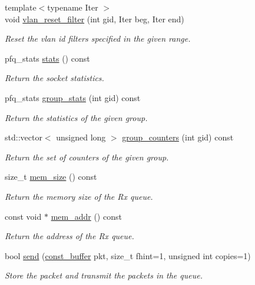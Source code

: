 \begin{DoxyCompactItemize}
{\footnotesize template$<$typename Iter $>$ }\\void \hyperlink{classpfq_1_1socket_a18efa89248a6d6bfb29d575744d21608}{vlan\+\_\+reset\+\_\+filter} (int gid, Iter beg, Iter end)
\begin{DoxyCompactList}\small\item\em Reset the vlan id filters specified in the given range. \end{DoxyCompactList}\item 
pfq\+\_\+stats \hyperlink{classpfq_1_1socket_a0a0a637d733613bf86d6d85168d2e37f}{stats} () const 
\begin{DoxyCompactList}\small\item\em Return the socket statistics. \end{DoxyCompactList}\item 
pfq\+\_\+stats \hyperlink{classpfq_1_1socket_a39397866032a4654c4dc000185c61e01}{group\+\_\+stats} (int gid) const 
\begin{DoxyCompactList}\small\item\em Return the statistics of the given group. \end{DoxyCompactList}\item 
std\+::vector$<$ unsigned long $>$ \hyperlink{classpfq_1_1socket_a5bb4734939ffeb151e199182ec30c4de}{group\+\_\+counters} (int gid) const 
\begin{DoxyCompactList}\small\item\em Return the set of counters of the given group. \end{DoxyCompactList}\item 
size\+\_\+t \hyperlink{classpfq_1_1socket_a1888ae33a42258fdbb2aac1dc3feb55c}{mem\+\_\+size} () const 
\begin{DoxyCompactList}\small\item\em Return the memory size of the Rx queue. \end{DoxyCompactList}\item 
const void $\ast$ \hyperlink{classpfq_1_1socket_a32275b5b77913fadc7671efdef75369b}{mem\+\_\+addr} () const 
\begin{DoxyCompactList}\small\item\em Return the address of the Rx queue. \end{DoxyCompactList}\item 
bool \hyperlink{classpfq_1_1socket_a2d80378cecae811bedc0ae8ff9412e62}{send} (\hyperlink{namespacepfq_ac835a1bd09b4cbaba61c100b50d0a99f}{const\+\_\+buffer} pkt, size\+\_\+t fhint=1, unsigned int copies=1)
\begin{DoxyCompactList}\small\item\em Store the packet and transmit the packets in the queue. \end{DoxyCompactList}\item 

\end{DoxyCompactItemize}
